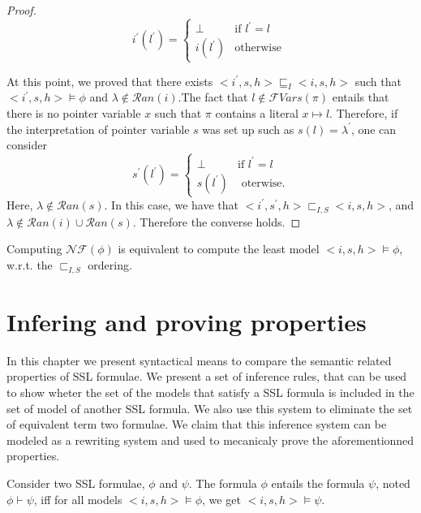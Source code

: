 \documentclass[a4paper,twoside,12pt]{report}
\newcommand{\Pointsto}[2]{ #1 \mapsto #2}
\newcommand{\NForm}[1]{\mathcal{NF}(#1)}
\newcommand{\Ran}[1]{\mathcal{R}an(#1)}
\newcommand{\FVars}[1]{\mathcal{F}Vars(#1)}
\newcommand{\LocOrderIeq}[0]{\sqsubseteq_{I}}
\newcommand{\ModOrderIneq}[0]{\sqsubset_{I,S}}
\begin{document}
\begin{proof}
$$
i^{\prime}(l^{\prime})= \left \lbrace 
\begin{array}{ll} 
 \bot & \mbox{if } l^{\prime}=l \\
 i(l^{\prime}) & \mbox{otherwise }
\end{array} \right .
$$  

At this point, we proved that there exists $<i^{\prime},s,h>\LocOrderIeq <i,s,h>$ such that $<i^{\prime},s,h>\models \phi$ and $\lambda \not \in \Ran{i}$.The fact that $l\not\in \FVars{\pi}$ entails that there is no pointer variable $x$ such that $\pi$ contains a literal $\Pointsto{x}{l}$. Therefore, if
the interpretation of pointer variable $s$ was set up such as $s(l)=\lambda^{\prime}$, 
one can consider
 $$s^{\prime}(l^{\prime}) = 
	\left \lbrace \begin{array}{ll}
	\bot & \mbox{if } l^{\prime} = l \\
	s(l^{\prime}) & \mbox{ oterwise.}		
	\end{array} \right .
$$
Here, $\lambda \not\in \Ran{s}$.
In this case, we have that $<i^{\prime},s^{\prime},h>\ModOrderIneq <i,s,h>$,
and $\lambda \not\in \Ran{i}\cup\Ran{s}$. Therefore the converse holds.
\end{proof}


\begin{theorem}
Computing $\NForm{\phi}$ is equivalent to compute the least model
$<i,s,h>\models \phi$, w.r.t. the $\ModOrderIneq$ ordering.
\end{theorem}

\chapter{Infering and proving properties}


In this chapter we present syntactical means to compare the semantic
related  
properties of SSL formulae. We present a set of inference rules, that
can be used to show wheter the set of the models that satisfy a SSL
formula is included in the set of model of another SSL formula. We also use
this system to eliminate the set of equivalent term two formulae. 
We claim that this inference system can be modeled as a rewriting system
and used to mecanicaly prove the aforementionned properties.

\label{sec:entailement}
\begin{definition}[Entailement]
Consider two SSL formulae, $\phi$ and $\psi$. The formula $\phi$ entails the
formula $\psi$, noted $\phi \vdash \psi$, iff for all models $<i,s,h>\models \phi$, we get  $<i,s,h>\models \psi$.
\end{definition}
\end{document}
